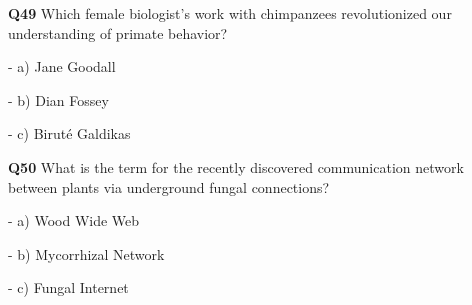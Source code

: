 \textbf{Q49} Which female biologist's work with chimpanzees revolutionized our understanding of primate behavior?\par
\quad - a) Jane Goodall\par
\quad - b) Dian Fossey\par
\quad - c) Biruté Galdikas\par

\textbf{Q50} What is the term for the recently discovered communication network between plants via underground fungal connections?\par
\quad - a) Wood Wide Web\par
\quad - b) Mycorrhizal Network\par
\quad - c) Fungal Internet\par